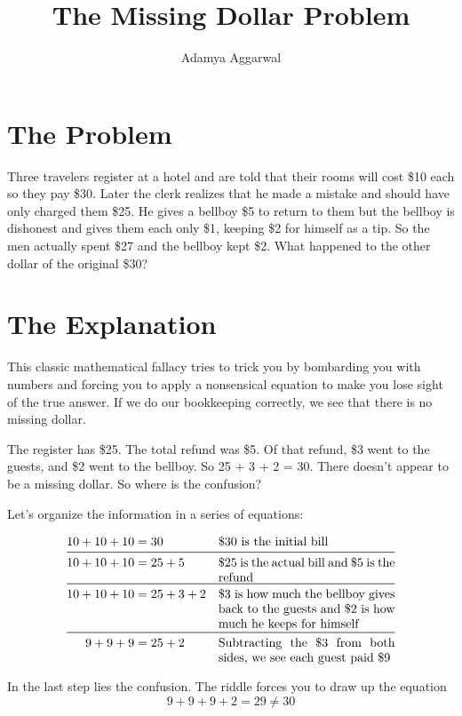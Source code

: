 \documentclass{article}
\title{The Missing Dollar Problem}
\begin{document}
\author{Adamya Aggarwal}
\maketitle


\section*{The Problem}
Three travelers register at a hotel and are told that their rooms will cost \$10 each so they pay \$30. Later the clerk realizes that he made a mistake and should have only charged them \$25. He gives a bellboy \$5 to return to them but the bellboy is dishonest and gives them each only \$1, keeping \$2 for himself as a tip. So the men actually spent \$27 and the bellboy kept \$2. What happened to the other dollar of the original \$30?

\section*{The Explanation}
This classic mathematical fallacy tries to trick you by bombarding you with numbers and forcing you to apply a nonsensical equation to make you lose sight of the true answer. If we do our bookkeeping correctly, we see that there is no missing dollar. 

The register has \$25. The total refund was \$5. Of that refund, \$3 went to the guests, and \$2 went to the bellboy. So 25 + 3 + 2 = 30. There doesn’t appear to be a missing dollar. So where is the confusion?

Let’s organize the information in a series of equations:

\vspace{-5mm}

\begin{align*}
    10 + 10 + 10 &= 30 && \text{\$30 is the initial bill} \\
    \midrule
    10 + 10 + 10 &= 25 + 5 && \parbox[t]{5cm}{
          \$25 is the actual bill and \$5 is the refund} \\
    \midrule
    10 + 10 + 10 &= 25 + 3 + 2 && \parbox[t]{5cm}{
          \$3 is how much the bellboy gives back to the guests and \$2 is how much he keeps for himself} \\
    \midrule
    9 + 9 + 9 &= 25 + 2 && \parbox[t]{5cm}{
            Subtracting the \$3 from both sides, we see each guest paid \$9}
\end{align*}

In the last step lies the confusion. The riddle forces you to draw up the equation
\begin{equation*}
    9 + 9 + 9 + 2 = 29 \neq 30
\end{equation*}
\end{document}
